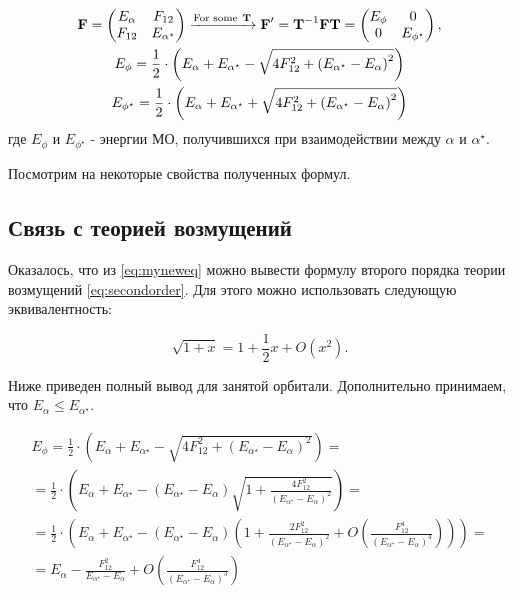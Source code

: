 \documentclass{article}
\begin{document}
\begin{gather}
    \textbf{F} = 
    \begin{pmatrix}
        E_{\alpha} & F_{12} \\
        F_{12} & E_{\alpha^{\star}}
    \end{pmatrix}
    \xrightarrow{\text{For some}\ \textbf{T}}
    \textbf{F}' = \textbf{T}^{-1} \textbf{F} \textbf{T} = 
    \begin{pmatrix}
        E_{\phi} & 0 \\
        0 & E_{\phi^{\star}}
    \end{pmatrix},\notag\\
    E_{\phi} = \frac{1}{2} \cdot \left( E_{\alpha} + E_{\alpha^{\star}} - \sqrt{4F_{12}^2 + \left( E_{\alpha^{\star}} - E_{\alpha}\right)^2 } \right) \notag\\
    E_{\phi^{\star}} = \frac{1}{2} \cdot \left( E_{\alpha} + E_{\alpha^{\star}} + \sqrt{4F_{12}^2 + \left( E_{\alpha^{\star}} - E_{\alpha}\right)^2 } \right)
    \label{eq:myneweq}
\end{gather}
где $E_{\phi}$ и $E_{\phi^{\star}}$ - энергии МО, получившихся при взаимодействии между $\alpha$ и $\alpha^\star$.

Посмотрим на некоторые свойства полученных формул.

\subsection{Связь с теорией возмущений}

Оказалось, что из \eqref{eq:myneweq} можно вывести формулу второго порядка теории возмущений \eqref{eq:secondorder}. Для этого можно использовать следующую эквивалентность:

\begin{equation}
    \sqrt{1+x} = 1 + \frac{1}{2} x + O(x^2).
\end{equation}

Ниже приведен полный вывод для занятой орбитали. Дополнительно принимаем, что $E_{\alpha} \leq E_{\alpha^{\star}}$.

\begin{gather} \label{eq:case1start}
    E_{\phi} = \frac{1}{2} \cdot \left( E_{\alpha} + E_{\alpha^{\star}} - \sqrt{4F_{12}^2 + \left( E_{\alpha^{\star}} - E_{\alpha}\right)^2 } \right) =  \\ 
    = \frac{1}{2} \cdot \left( E_{\alpha} + E_{\alpha^{\star}} - \left( E_{\alpha^{\star}} - E_{\alpha}\right) \sqrt{ 1 + \frac{4 F_{12}^2}{\left( E_{\alpha^{\star}} - E_{\alpha}\right)^2} } \right) = \\
    = \frac{1}{2} \cdot \left( E_{\alpha} + E_{\alpha^{\star}} - \left( E_{\alpha^{\star}} - E_{\alpha}\right) \left(1 + \frac{2 F_{12}^2}{\left( E_{\alpha^{\star}} - E_{\alpha}\right)^2} + O\left(\frac{F_{12}^4}{\left( E_{\alpha^{\star}} - E_{\alpha}\right)^4}\right) \right) \right) = \\
    = E_{\alpha} - \frac{F_{12}^2}{E_{\alpha^{\star}} - E_{\alpha}} + O\left(\frac{F_{12}^4}{\left( E_{\alpha^{\star}} - E_{\alpha}\right)^3}\right) \label{eq:case1end}
\end{gather} 
\end{document}
